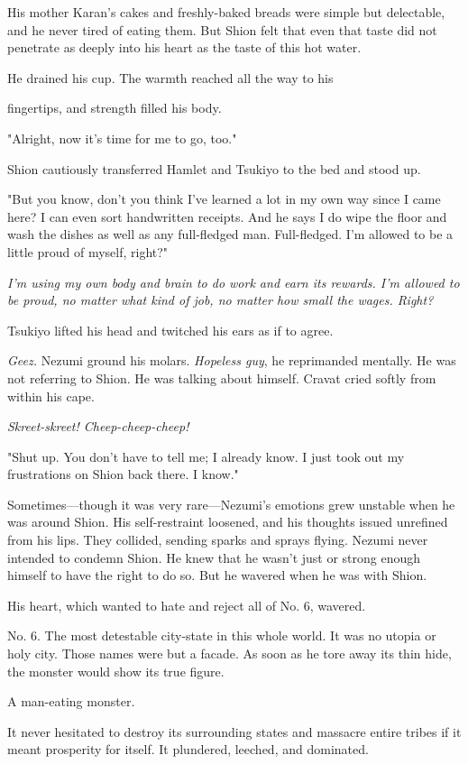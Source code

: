 His mother Karan's cakes and freshly-baked breads were simple but
delectable, and he never tired of eating them. But Shion felt that even
that taste did not penetrate as deeply into his heart as the taste of
this hot water.~

He drained his cup. The warmth reached all the way to his~

fingertips, and strength filled his body.

"Alright, now it's time for me to go, too."

Shion cautiously transferred Hamlet and Tsukiyo to the bed and stood up.

"But you know, don't you think I've learned a lot in my own way since I
came here? I can even sort handwritten receipts. And he says I do wipe
the floor and wash the dishes as well as any full-fledged man.
Full-fledged. I'm allowed to be a little proud of myself, right?"

\emph{I'm using my own body and brain to do work and earn its rewards. I'm
allowed to be proud, no matter what kind of job, no matter how small the
wages. Right?}

Tsukiyo lifted his head and twitched his ears as if to agree.

\emph{Geez.} Nezumi ground his molars. \emph{Hopeless guy}, he reprimanded mentally.
He was not referring to Shion. He was talking about himself. Cravat
cried softly from within his cape.

\emph{Skreet-skreet! Cheep-cheep-cheep!}

"Shut up. You don't have to tell me; I already know. I just took out my
frustrations on Shion back there. I know."

Sometimes---though it was very rare---Nezumi's emotions grew unstable when
he was around Shion. His self-restraint loosened, and his thoughts
issued unrefined from his lips. They collided, sending sparks and sprays
flying. Nezumi never intended to condemn Shion. He knew that he wasn't
just or strong enough himself to have the right to do so. But he wavered
when he was with Shion.

His heart, which wanted to hate and reject all of No. 6, wavered.

No. 6. The most detestable city-state in this whole world. It was no
utopia or holy city. Those names were but a facade. As soon as he tore
away its thin hide, the monster would show its true figure.

A man-eating monster.

It never hesitated to destroy its surrounding states and massacre entire
tribes if it meant prosperity for itself. It plundered, leeched, and
dominated.

